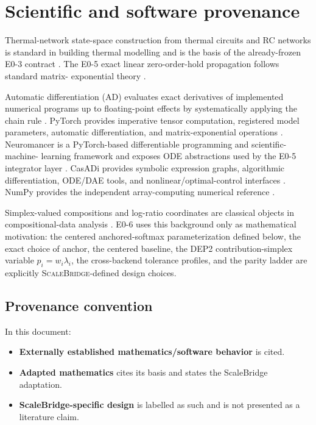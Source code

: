 \documentclass[11pt]{article}
\newcommand{\SB}{\textsc{ScaleBridge}}
\begin{document}
\section{Scientific and software provenance}

Thermal-network state-space construction from thermal circuits and RC networks
is standard in building thermal modelling and is the basis of the already-frozen
E0-3 contract \cite{GhiausAhmad2020ThermalCircuits,BacherMadsen2011HeatDynamics,
ArroyoSpiessensHelsen2020MultiZone,VallianosAthienitisDelcroix2022MultiZoneRC}.
The E0-5 exact linear zero-order-hold propagation follows standard matrix-
exponential theory \cite{Higham2009MatrixExponential,VanLoan1978MatrixExponentialIntegrals}.

Automatic differentiation (AD) evaluates exact derivatives of implemented
numerical programs up to floating-point effects by systematically applying the
chain rule \cite{Baydin2018AD}. PyTorch provides imperative tensor computation,
registered model parameters, automatic differentiation, and matrix-exponential
operations \cite{Paszke2019PyTorch,PyTorchParameterDocs2026,PyTorchMatrixExpDocs2026}.
Neuromancer is a PyTorch-based differentiable programming and scientific-machine-
learning framework and exposes ODE abstractions used by the E0-5 integrator layer
\cite{Neuromancer2023,NeuromancerDocs2026}. CasADi provides symbolic expression
graphs, algorithmic differentiation, ODE/DAE tools, and nonlinear/optimal-control
interfaces \cite{Andersson2019CasADi,CasADiDocs2026}. NumPy provides the
independent array-computing numerical reference \cite{Harris2020NumPy}.

Simplex-valued compositions and log-ratio coordinates are classical objects in
compositional-data analysis \cite{Aitchison1982Compositional}. E0-6 uses this
background only as mathematical motivation: the centered anchored-softmax
parameterization defined below, the exact choice of anchor, the centered
baseline, the DEP2 contribution-simplex variable $p_i=w_i\lambda_i$, the
cross-backend tolerance profiles, and the parity ladder are explicitly
\SB{}-defined design choices.

\subsection*{Provenance convention}
In this document:
\begin{itemize}[leftmargin=*]
\item \textbf{Externally established mathematics/software behavior} is cited.
\item \textbf{Adapted mathematics} cites its basis and states the ScaleBridge
adaptation.
\item \textbf{ScaleBridge-specific design} is labelled as such and is not
presented as a literature claim.
\end{itemize}
\end{document}
